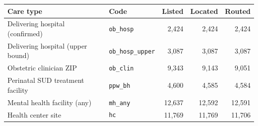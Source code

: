 \begin{tabular}{@{}llrrr@{}}
\toprule
Care type & Code & Listed & Located & Routed \\
\midrule
Delivering hospital (confirmed) & \texttt{ob\_hosp} & 2{,}424 & 2{,}424 & 2{,}424 \\
Delivering hospital (upper bound) & \texttt{ob\_hosp\_upper} & 3{,}087 & 3{,}087 & 3{,}087 \\
Obstetric clinician ZIP & \texttt{ob\_clin} & 9{,}343 & 9{,}143 & 9{,}051 \\
Perinatal SUD treatment facility & \texttt{ppw\_bh} & 4{,}600 & 4{,}585 & 4{,}584 \\
Mental health facility (any) & \texttt{mh\_any} & 12{,}637 & 12{,}592 & 12{,}591 \\
Health center site & \texttt{hc} & 11{,}769 & 11{,}769 & 11{,}706 \\
\bottomrule
\end{tabular}
